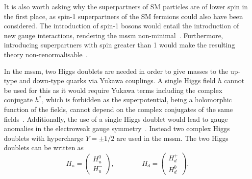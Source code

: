 It is also worth asking why the superpartners of SM particles are of lower spin in the first place, as \eg spin-1 superpartners of the SM fermions could also have been considered. The introduction of spin-1 bosons would entail the introduction of new gauge interactions, rendering the \gls{mssm} non-minimal~\cite{Bustamante:2009us}. Furthermore, introducing superpartners with spin greater than 1 would make the resulting theory non-renormalisable~\cite{Bustamante:2009us}.

In the \gls{mssm}, two Higgs doublets are needed in order to give masses to the up-type and down-type quarks via Yukawa couplings. A single Higgs field $h$ cannot be used for this as it would require Yukawa terms including the complex conjugate $h^*$, which is forbidden as the superpotential, being a holomorphic function of the fields, cannot depend on the complex conjugates of the same fields~\cite{Bustamante:2009us}. Additionally, the use of a single Higgs doublet would lead to gauge anomalies in the electroweak gauge symmetry~\cite{PhysRevD.6.429}. Instead two complex Higgs doublets with hypercharge $Y = \pm 1/2$ are used in the \gls{mssm}. The two Higgs doublets can be written as
\begin{equation}
	H_u = \begin{pmatrix}
		H^0_u \\
		H^-_u
	\end{pmatrix}, \qquad \qquad
	H_d = \begin{pmatrix}
		H^+_d \\
		H^0_d
	\end{pmatrix}.
	\label{eq:Higgs_doublets}
\end{equation}

